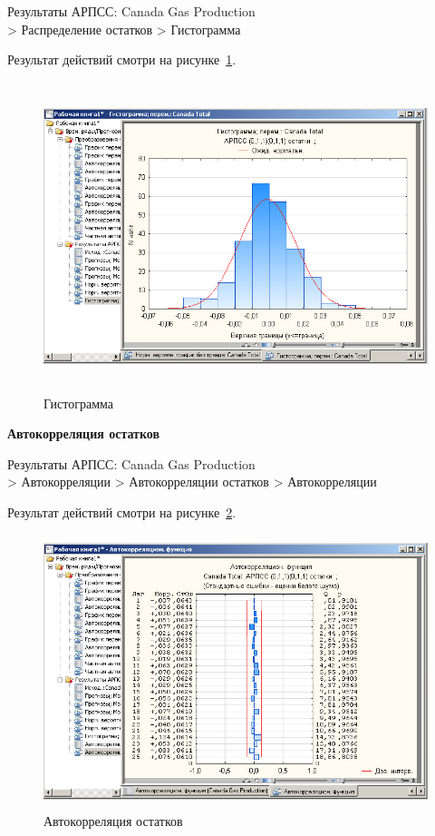 Результаты АРПСС: Canada Gas Production\\
> Распределение остатков
> Гистограмма

Результат действий смотри на рисунке~\ref{fig:2_19}.

\begin{figure}[!h]
  \centering

  \includegraphics[height=9cm]
  {inc/Canada_Gas_Production/19.PNG}

  \caption{Гистограмма}

  \label{fig:2_19}
\end{figure}

\newpage

\begin{center}
  \textbf{Автокорреляция остатков}
\end{center}

Результаты АРПСС: Canada Gas Production\\
> Автокорреляции
> Автокорреляции остатков
> Автокорреляции

Результат действий смотри на рисунке~\ref{fig:2_20}.

\begin{figure}[!h]
  \centering

  \includegraphics[height=8cm]
  {inc/Canada_Gas_Production/20.PNG}

  \caption{Автокорреляция остатков}

  \label{fig:2_20}
\end{figure}

